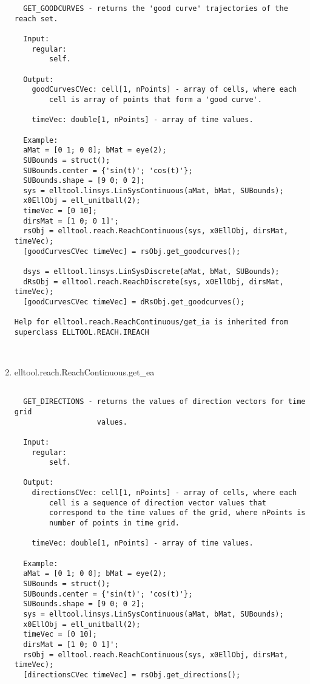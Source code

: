 \begin{enumerate}
\begin{lstlisting}
  GET_GOODCURVES - returns the 'good curve' trajectories of the reach set.

  Input:
    regular:
        self.

  Output:
    goodCurvesCVec: cell[1, nPoints] - array of cells, where each
        cell is array of points that form a 'good curve'.

    timeVec: double[1, nPoints] - array of time values.

  Example:
  aMat = [0 1; 0 0]; bMat = eye(2);
  SUBounds = struct();
  SUBounds.center = {'sin(t)'; 'cos(t)'};
  SUBounds.shape = [9 0; 0 2];
  sys = elltool.linsys.LinSysContinuous(aMat, bMat, SUBounds);
  x0EllObj = ell_unitball(2);
  timeVec = [0 10];
  dirsMat = [1 0; 0 1]';
  rsObj = elltool.reach.ReachContinuous(sys, x0EllObj, dirsMat, timeVec);
  [goodCurvesCVec timeVec] = rsObj.get_goodcurves();

  dsys = elltool.linsys.LinSysDiscrete(aMat, bMat, SUBounds);
  dRsObj = elltool.reach.ReachDiscrete(sys, x0EllObj, dirsMat, timeVec);
  [goodCurvesCVec timeVec] = dRsObj.get_goodcurves();

Help for elltool.reach.ReachContinuous/get_ia is inherited from superclass ELLTOOL.REACH.IREACH



\end{lstlisting}
\fontfamily{\familydefault}
\selectfont
\item {elltool.reach.ReachContinuous.get\_ea}
\selectfont
\begin{lstlisting}

  GET_DIRECTIONS - returns the values of direction vectors for time grid
                   values.

  Input:
    regular:
        self.

  Output:
    directionsCVec: cell[1, nPoints] - array of cells, where each
        cell is a sequence of direction vector values that
        correspond to the time values of the grid, where nPoints is
        number of points in time grid.

    timeVec: double[1, nPoints] - array of time values.

  Example:
  aMat = [0 1; 0 0]; bMat = eye(2);
  SUBounds = struct();
  SUBounds.center = {'sin(t)'; 'cos(t)'};
  SUBounds.shape = [9 0; 0 2];
  sys = elltool.linsys.LinSysContinuous(aMat, bMat, SUBounds);
  x0EllObj = ell_unitball(2);
  timeVec = [0 10];
  dirsMat = [1 0; 0 1]';
  rsObj = elltool.reach.ReachContinuous(sys, x0EllObj, dirsMat, timeVec);
  [directionsCVec timeVec] = rsObj.get_directions();


\end{lstlisting}
\end{enumerate}
